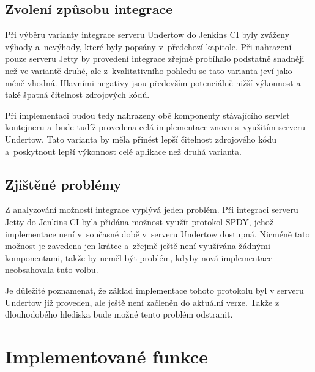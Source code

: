         \subsection{Zvolení způsobu integrace}
            Při výběru varianty integrace serveru Undertow do Jenkins CI byly zváženy
            výhody a~nevýhody, které byly popsány v~předchozí kapitole. Při nahrazení pouze serveru Jetty
            by provedení integrace zřejmě probíhalo podstatně snadněji než ve variantě druhé,
            ale z~kvalitativního pohledu se tato varianta jeví jako méně vhodná. 
            Hlavními 
            negativy jsou především potenciálně nižší výkonnost a také špatná čitelnost
            zdrojových kódů.

            Při implementaci budou tedy nahrazeny obě komponenty stávajícího servlet kontejneru
            a~bude tudíž provedena celá implementace znovu s~využitím serveru Undertow. Tato
            varianta by měla přinést lepší čitelnost zdrojového kódu a~poskytnout 
            lepší výkonnost celé aplikace než druhá varianta.

        \subsection{Zjištěné problémy}
            Z analyzování možností integrace vyplývá jeden problém.
            Při integraci serveru Jetty do Jenkins CI byla přidána
            možnost využít protokol SPDY, jehož implementace
            není v~současné době v~serveru Undertow dostupná. Nicméně tato možnost
            je zavedena jen krátce a~zřejmě ještě není využívána žádnými komponentami,
            takže by neměl být problém, kdyby nová implementace neobsahovala tuto volbu.
            
            Je důležité poznamenat, že základ implementace tohoto protokolu byl v 
            serveru Undertow již proveden, ale ještě není začleněn do aktuální 
            verze. Takže z dlouhodobého hlediska bude možné tento problém odstranit.
            








        \section{Implementované funkce}




